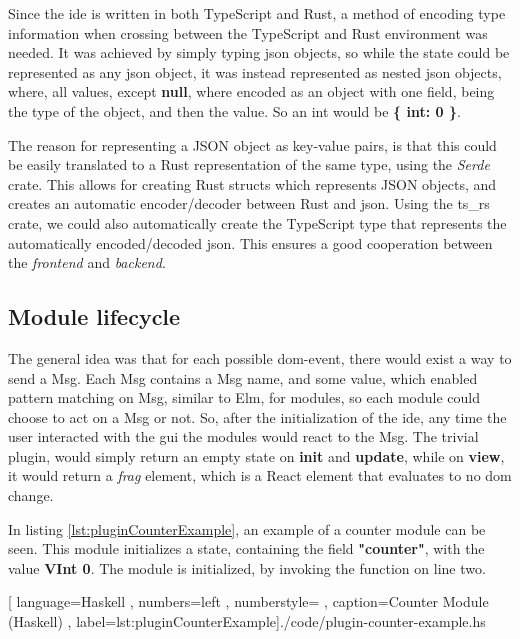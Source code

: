 Since the \gls*{ide} is written in both TypeScript and Rust, a method of encoding
type information when crossing between the TypeScript and Rust environment was
needed. It was achieved by simply typing \gls*{json} objects, so while the state
could be represented as any \gls*{json} object, it was instead represented as
nested \gls*{json} objects, where, all values, except \textbf{null}, where
encoded as an object with one field, being the type of the object, and then the
value. So an int would be \textbf{\{ int: 0 \}}.

The reason for representing a JSON object as key-value pairs, is that this could
be easily translated to a Rust representation of the same type, using the
\textit{Serde} crate. This allows for creating Rust structs which represents
JSON objects, and creates an automatic encoder/decoder between Rust and
\gls*{json}. Using the ts\_rs crate, we could also automatically create the
TypeScript type that represents the automatically encoded/decoded \gls*{json}.
This ensures a good cooperation between the \textit{frontend} and
\textit{backend}.

\subsection{Module lifecycle}

The general idea was that for each possible \gls*{dom}-event, there would exist a
way to send a Msg. Each Msg contains a Msg name, and some value, which enabled
pattern matching on Msg, similar to Elm, for modules, so each module could
choose to act on a Msg or not. So, after the initialization of the \gls*{ide},
any time the user interacted with the \gls*{gui} the modules would react to the
Msg. The trivial plugin, would simply return an empty state on \textbf{init} and
\textbf{update}, while on \textbf{view}, it would return a \textit{frag}
element, which is a React element that evaluates to no \gls*{dom} change.

In listing \ref{lst:pluginCounterExample}, an example of a counter module can be
seen. This module initializes a state, containing the field \textbf{"counter"},
with the value \textbf{VInt 0}. The module is initialized, by invoking the
function on line two.

\begin{center}
  
    [ language=Haskell
    , numbers=left
    , numberstyle=\tiny\color{gray}
    , caption={Counter Module (Haskell)}
    , label=lst:pluginCounterExample]{./code/plugin-counter-example.hs}
\end{center}

